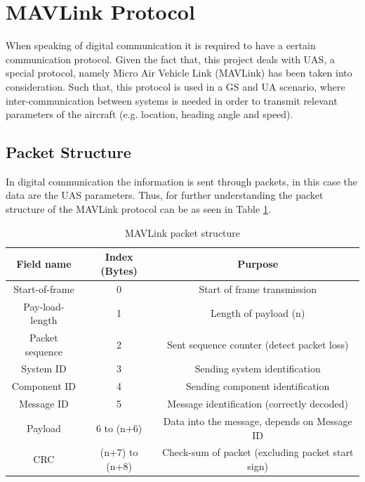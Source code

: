 \section{MAVLink Protocol}\label{sec:mavlink}
When speaking of digital communication it is required to have a certain communication protocol. Given the fact that, this project deals with UAS, a special protocol, namely Micro Air Vehicle Link (MAVLink) has been taken into consideration. Such that, this protocol is used in a GS and UA scenario, where inter-communication between systems is needed in order to transmit relevant parameters of the aircraft (e.g. location, heading angle and speed).  

\subsection{Packet Structure}
In digital communication the information is sent through packets, in this case the data are the UAS parameters. Thus, for further understanding the packet structure of the MAVLink protocol can be as seen in Table \ref{tab:mavlink}.

\begin{table}[h]
	\centering
	\begin{tabular}{|c||c|c|}
		\hline
		Field name       & Index (Bytes)  & Purpose											     \\ \hline\hline
		Start-of-frame   &      0         & Start of frame transmission 							   \\ \hline
		Pay-load-length  &      1         & Length of payload (n)       							   \\ \hline
		Packet sequence  &      2    	  & Sent sequence counter (detect packet loss)                 \\ \hline
		System ID        & 		3		  & Sending system identification 							   \\ \hline
		Component ID     & 		4 		  & Sending component identification 						   \\ \hline
		Message ID       & 		5 		  & Message identification (correctly decoded)      		   \\ \hline
		Payload          &   6 to (n+6)   & Data into the message, depends on Message ID        	   \\ \hline
		CRC              & (n+7) to (n+8) & Check-sum of packet (excluding packet start sign)          \\ \hline
	\end{tabular}
	\caption{MAVLink packet structure}
	\label{tab:mavlink}
\end{table}

